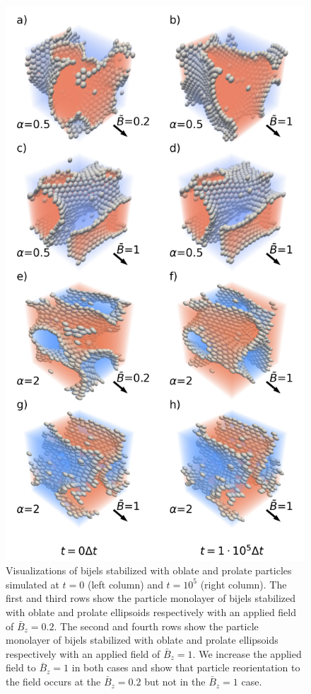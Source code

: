 \begin{figure}
\centering 
\includegraphics[scale=0.4]{../figures/results/paper2/microstructure_viz-field_up.png} 
\caption{Visualizations of bijels stabilized with oblate and prolate particles simulated at $t = 0$ (left column) and $t = 10^5$ (right column). The first and third rows show the particle monolayer of bijels stabilized with oblate and prolate ellipsoids respectively with an applied field of $\bar{B}_z = 0.2$. The second and fourth rows show the particle monolayer of bijels stabilized with oblate and prolate ellipsoids respectively with an applied field of $\bar{B}_z = 1$. We increase the applied field to $\bar{B}_z = 1$ in both cases and show that particle reorientation to the field occurs at the $\bar{B}_z = 0.2$ but not in the $\bar{B}_z = 1$ case.}
\label{fig:microstructure_viz-field_up}
\end{figure}

